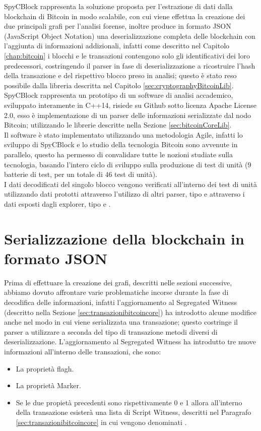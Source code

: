 SpyCBlock rappresenta la soluzione proposta per l'estrazione di dati dalla blockchain di Bitcoin in modo scalabile, con cui viene effettua la creazione dei due principali grafi per l'analisi forense, inoltre produce in formato JSON (JavaScript Object Notation) una deserializzazione completa delle blockchain con l'aggiunta di informazioni addizionali, infatti come descritto nel Capitolo \ref{chap:bitcoin} i blocchi e le transazioni contengono solo gli identificativi dei loro predecessori, costringendo il parser in fase di deserializzazione a ricostruire l'hash della transazione e del rispettivo blocco preso in analisi; questo è stato reso possibile dalla libreria descritta nel Capitolo \ref{sec:cryptographyBitcoinLib}.\\
SpyCBlock rappresenta un prototipo di un software di analisi accademico, sviluppato interamente in C++14, risiede su Github sotto licenza Apache License 2.0, esso è implementazione di un parser delle informazioni serializzate dal nodo Bitcoin; utilizzando le librerie descritte nella Sezione \ref{sec:bitcoinCoreLib}.\\
Il software è stato implementato utilizzando una metodologia Agile, infatti lo sviluppo di SpyCBlock e lo studio della tecnologia Bitcoin sono avvenute in parallelo, questo ha permesso di convalidare tutte le nozioni studiate sulla tecnologia, basando l'intero ciclo di sviluppo sulla produzione di test di unità (9 batterie di test, per un totale di 46 test di unità).\\
I dati decodificati del singolo blocco vengono verificati all'interno dei test di unità utilizzando dati prototti attraverso l'utilizzo di altri parser, tipo \cite{parser:blocktools} e attraverso i dati esposti dagli explorer, tipo \cite{blockstream:esplora} e \cite{blockchain:explorer}.\\

\section{Serializzazione della blockchain in formato JSON} \label{sec:spycblock}

Prima di effettuare la creazione dei grafi, descritti nelle sezioni successive, abbiamo dovuto affrontare varie problematiche incorse durante la fase di decodifica delle informazioni, infatti l'aggiornamento al Segregated Witness (descritto nella Sezione \ref{sec:transazionibitcoincore}) ha introdotto alcune modifice anche nel modo in cui viene serializzata una transazione; questo costringe il parser a utilizzare a seconda del tipo di transazione metodi diversi di deserializzazione.
L'aggiornamento al Segregated Witness ha introdutto tre nuove informazioni all'interno delle transazioni, che sono:
\begin{itemize}
  \item La proprietà flagh.
  \item La proprietà Marker.
  \item Se le due propietà precedenti sono rispettivamente 0 e 1 allora all'interno della transazione esisterà una lista di Script Witness, descritti nel Paragrafo \ref{sec:transazionibitcoincore} in cui vengono denominati .
\end{itemize}


